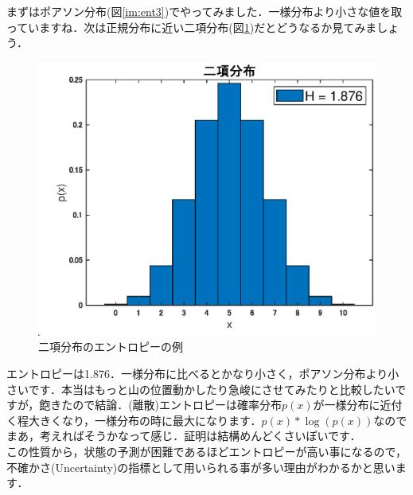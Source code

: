 \documentclass[11pt,a4paper]{ujreport}
\begin{document}
まずはポアソン分布(図\ref{im:ent3})でやってみました．一様分布より小さな値を取っていますね．次は正規分布に近い二項分布(図\ref{im:ent4})だとどうなるか見てみましょう．

\begin{figure}[H]
\label{im:ent4}
  \centering
  \includegraphics[width=15cm]{../figures/ent_bi.eps}
  \caption{二項分布のエントロピーの例}
\end{figure}

エントロピーは1.876．一様分布に比べるとかなり小さく，ポアソン分布より小さいです．本当はもっと山の位置動かしたり急峻にさせてみたりと比較したいですが，飽きたので結論．(離散)エントロピーは確率分布$p(x)$が一様分布に近付く程大きくなり，一様分布の時に最大になります．$p(x) * \log(p(x))$なのでまあ，考えればそうかなって感じ．証明は結構めんどくさいぽいです．\\

この性質から，状態の予測が困難であるほどエントロピーが高い事になるので，不確かさ(Uncertainty)の指標として用いられる事が多い理由がわかるかと思います．\\
\\
\end{document}
